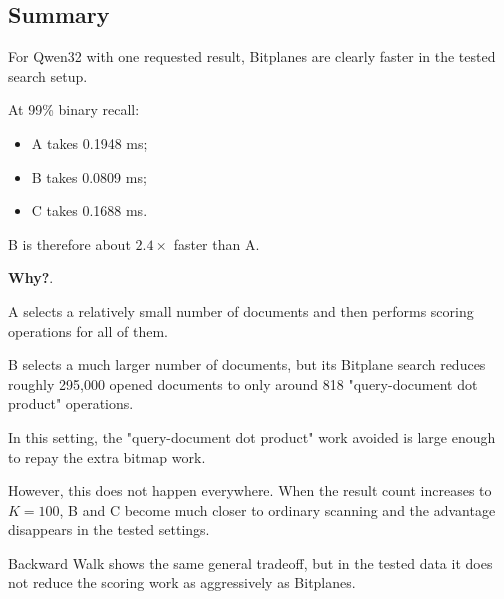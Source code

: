 




\subsection{Summary}

For Qwen32 with one requested result, Bitplanes are clearly faster in the tested search setup.

At 99\% binary recall:
\begin{itemize}\setlength{\itemsep}{1pt}
\item A takes 0.1948 ms;
\item B takes 0.0809 ms;
\item C takes 0.1688 ms.
\end{itemize}
B is therefore about $2.4\times$ faster than A.

\textbf{Why?}.

A selects a relatively small number of documents and then performs scoring operations for all of them.

B selects a much larger number of documents, but its Bitplane search reduces roughly 295,000 opened documents to only around 818 "query-document dot product" operations.

In this setting, the "query-document dot product" work avoided is large enough to repay the extra bitmap work.

However, this does not happen everywhere. When the result count increases to $K=100$, B and C become much closer to ordinary scanning and the advantage disappears in the tested settings.



Backward Walk shows the same general tradeoff, but in the tested data it does not reduce the scoring work as aggressively as Bitplanes.
